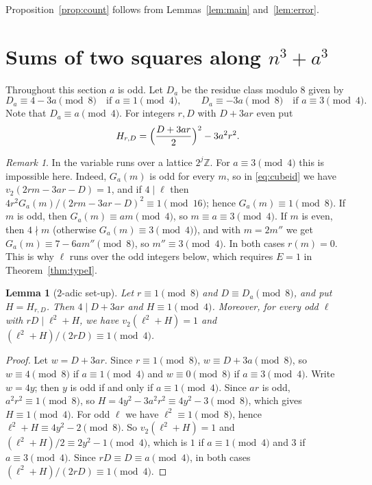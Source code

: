 \documentclass[11pt]{amsart}
\newtheorem{lemma}[theorem]{Lemma}
\theoremstyle{remark}
\newtheorem{remark}[theorem]{Remark}
\theoremstyle{definition}
\numberwithin{equation}{section}
\newcommand{\Z}{\mathbb{Z}}
\begin{document}
Proposition~\ref{prop:count} follows from Lemmas~\ref{lem:main} and~\ref{lem:error}.

\section{Sums of two squares along \texorpdfstring{$n^3+a^3$}{n\^{}3+a\^{}3}}\label{sec:cubes}

Throughout this section $a$ is odd. Let $D_a$ be the residue class modulo $8$ given by
\[
D_a\equiv4-3a\pmod 8\quad\text{if }a\equiv1\pmod4,\qquad D_a\equiv-3a\pmod8\quad\text{if }a\equiv3\pmod4.
\]
Note that $D_a\equiv a\pmod 4$. For integers $r,D$ with $D+3ar$ even put
\[
H_{r,D}=\Bigl(\frac{D+3ar}2\Bigr)^2-3a^2r^2.
\]

\begin{remark}\label{rem:whyodd}
In \cite{IC} the variable runs over a lattice $2^j\Z$. For $a\equiv3\pmod4$ this is impossible here. Indeed, $G_a(m)$ is odd for every $m$, so in \eqref{eq:cubeid} we have $v_2(2rm-3ar-D)=1$, and if $4\mid\ell$ then $4r^2G_a(m)/(2rm-3ar-D)^2\equiv1\pmod{16}$; hence $G_a(m)\equiv1\pmod 8$. If $m$ is odd, then $G_a(m)\equiv am\pmod 4$, so $m\equiv a\equiv3\pmod 4$. If $m$ is even, then $4\nmid m$ (otherwise $G_a(m)\equiv3\pmod4$), and with $m=2m''$ we get $G_a(m)\equiv7-6am''\pmod 8$, so $m''\equiv3\pmod4$. In both cases $r(m)=0$. This is why $\ell$ runs over the odd integers below, which requires $E=1$ in Theorem~\ref{thm:typeI}.
\end{remark}

\begin{lemma}[$2$-adic set-up]\label{lem:2adic-cubes}
Let $r\equiv1\pmod8$ and $D\equiv D_a\pmod8$, and put $H=H_{r,D}$. Then $4\mid D+3ar$ and $H\equiv1\pmod4$. Moreover, for every odd $\ell$ with $rD\mid\ell^2+H$, we have $v_2(\ell^2+H)=1$ and $(\ell^2+H)/(2rD)\equiv1\pmod4$.
\end{lemma}

\begin{proof}
Let $w=D+3ar$. Since $r\equiv1\pmod8$, $w\equiv D+3a\pmod 8$, so $w\equiv4\pmod8$ if $a\equiv1\pmod4$ and $w\equiv0\pmod8$ if $a\equiv3\pmod4$. Write $w=4y$; then $y$ is odd if and only if $a\equiv1\pmod4$. Since $ar$ is odd, $a^2r^2\equiv1\pmod8$, so $H=4y^2-3a^2r^2\equiv4y^2-3\pmod8$, which gives $H\equiv1\pmod4$. For odd $\ell$ we have $\ell^2\equiv1\pmod8$, hence $\ell^2+H\equiv4y^2-2\pmod8$. So $v_2(\ell^2+H)=1$ and $(\ell^2+H)/2\equiv2y^2-1\pmod4$, which is $1$ if $a\equiv1\pmod 4$ and $3$ if $a\equiv3\pmod4$. Since $rD\equiv D\equiv a\pmod4$, in both cases $(\ell^2+H)/(2rD)\equiv1\pmod 4$.
\end{proof}
\end{document}
